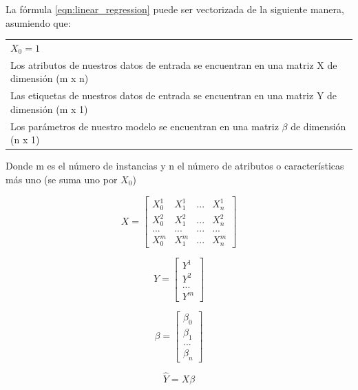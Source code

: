 \documentclass[11pt,fleqn]{book} %
\begin{document}
\FloatBarrier


La fórmula \ref{eqn:linear_regression} puede ser vectorizada de la siguiente manera, asumiendo que:

\begin{tabular}{l}
	$X_0 = 1$\\
	Los atributos de nuestros datos de entrada se encuentran en una matriz X de dimensión (m x n)\\
	Las etiquetas de nuestros datos de entrada se encuentran en una matriz Y de dimensión (m x 1)\\
	Los parámetros de nuestro modelo se encuentran en una matriz $\beta$ de dimensión (n x 1)\\
\end{tabular}

Donde m es el número de instancias y n el número de atributos o características más uno (se suma uno por $X_0$)


\begin{equation}
     X=\begin{bmatrix}
         X_{0}^{1} &   X_{1}^{1} & ...  &   X_{n}^{1} \\
         X_{0}^{2} &   X_{1}^{2} & ...  &   X_{n}^{2} \\
         ... &   ... & ...  &   ... \\
         X_{0}^{m} &   X_{1}^{m} & ...  &   X_{n}^{m} 
     \end{bmatrix}
\end{equation}
 
\begin{equation}
     Y=\begin{bmatrix}
         Y^{1}\\
         Y^{2}\\
         ...\\
         Y^{m}
        \end{bmatrix}
\end{equation}

\begin{equation}
     \beta=\begin{bmatrix}
         \beta_{0}\\
         \beta_{1}\\
         ...\\
         \beta_{n}
        \end{bmatrix}
\end{equation}

\begin{equation}
\label{eqn:linear_regression_vec}
\hat{Y}  = X \beta
\end{equation}
\end{document}
